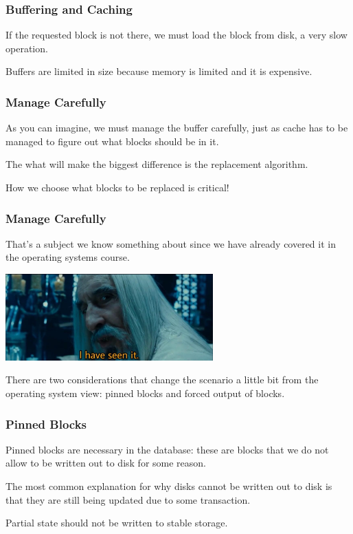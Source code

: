 \begin{frame}
\frametitle{Buffering and Caching}


If the requested block is not there, we must load the block from disk, a very slow operation. 

Buffers are limited in size because memory is limited and it is expensive.

\end{frame}


\begin{frame}
\frametitle{Manage Carefully}
As you can imagine, we must manage the buffer carefully, just as cache has to be managed to figure out what blocks should be in it. 

The what will make the biggest difference is the replacement algorithm.

How we choose what blocks to be replaced is critical! 


\end{frame}


\begin{frame}
\frametitle{Manage Carefully}

That's a subject we know something about since we have already covered it in the operating systems course.

\begin{center}
	\includegraphics[width=0.6\textwidth]{images/seenit.jpg}
\end{center}

There are two considerations that change the scenario a little bit from the operating system view: pinned blocks and forced output of blocks.


\end{frame}

\begin{frame}
\frametitle{Pinned Blocks}

\alert{Pinned blocks} are necessary in the database: these are blocks that we do not allow to be written out to disk for some reason. 

The most common explanation for why disks cannot be written out to disk is that they are still being updated due to some transaction. 

Partial state should not be written to stable storage. 

\end{frame}


